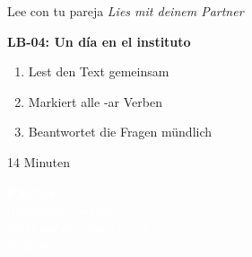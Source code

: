 \documentclass[aspectratio=169, 11pt]{beamer}
\newcommand{\seriftext}[1]{{\fontfamily{ppl}\selectfont #1}}
\newcommand{\es}[1]{\seriftext{\textbf{#1}}}
\newcommand{\de}[1]{\textit{\textcolor{mittelgrau}{#1}}}
\newcommand{\zeit}[1]{{\small\textcolor{mittelgrau}{#1}}}
\begin{document}
\begin{frame}{Lee con tu pareja \de{Lies mit deinem Partner}}
    \vspace{1cm}

    \begin{center}
        {\Large\es{LB-04: Un día en el instituto}}

        \vspace{1cm}

        \begin{enumerate}
            \item Lest den Text gemeinsam
            \item Markiert alle -ar Verben
            \item Beantwortet die Fragen mündlich
        \end{enumerate}

        \vspace{1cm}

        \zeit{14 Minuten}
    \end{center}
\end{frame}


\begin{frame}[plain]
    \vspace{3cm}
    \begin{center}
        {\Huge\bfseries\textcolor{white}{PAUSA}}\\[1cm]
        {\Large\textcolor{white}{¡Levantaos y estiraos!}}\\[0.5cm]
        {\large\textcolor{white}{\de{Steht auf und streckt euch!}}}\\[1cm]
        {\textcolor{white}{5 Minuten}}
    \end{center}
\end{frame}

\end{document}
